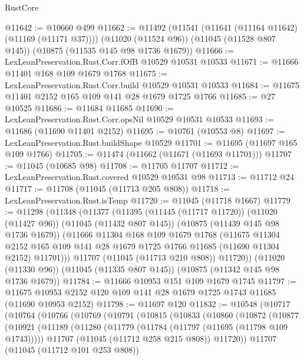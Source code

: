 \begin{lexlean}{RustCore}
\begin{coremodule}
@11642 := @10660 @499
@11662 := @11492
    (@11541 (@11641 (@11164 @11642) (@11169 (@11171 @37))))
    (@11020 (@11524 @96))
    (@11045 (@11528 @807 @145))
    (@10875 (@11535 @145 @98 @1736 @1679))
@11666 := LexLeanPreservation.Rust.Corr.fOfB @10529 @10531 @10533
@11671 := @11666 @11401 @168 @109 @1679 @1768
@11675 := LexLeanPreservation.Rust.Corr.build @10529 @10531 @10533
@11684 := @11675 @11401 @2152 @165 @109 @141 @28 @1679 @1725 @1766
@11685 := @27 @10525
@11686 := @11684 @11685
@11690 := LexLeanPreservation.Rust.Corr.opsNil @10529 @10531 @10533
@11693 := @11686 (@11690 @11401 @2152)
@11695 := @10761 (@10553 @8)
@11697 := LexLeanPreservation.Rust.buildShape @10529
@11701 := @11695 (@11697 @165 @109 @1766)
@11705 := @11474 (@11662 (@11671 (@11693 @11701)))
@11707 := @11045 (@10685 @98)
@11708 := @11705 @11707
@11712 := LexLeanPreservation.Rust.covered @10529 @10531 @98
@11713 := @11712 @24
@11717 := @11708 (@11045 (@11713 @205 @808))
@11718 := LexLeanPreservation.Rust.isTemp
@11720 := @11045 (@11718 @1667)
@11779 := @11298
    (@11348
      (@11377
        (@11395
          (@11445 (@11717 @11720))
          (@11020 (@11427 @96))
          (@11045 (@11432 @807 @145))
          (@10875 (@11439 @145 @98 @1736 @1679))
          (@11666
            @11304
            @168
            @109
            @1679
            @1768
            (@11675
              @11304
              @2152
              @165
              @109
              @141
              @28
              @1679
              @1725
              @1766
              @11685
              (@11690 @11304 @2152)
              @11701)))
        @11707
        (@11045 (@11713 @210 @808))
        @11720))
    (@11020 (@11330 @96))
    (@11045 (@11335 @807 @145))
    (@10875 (@11342 @145 @98 @1736 @1679))
@11784 := @11666 @10953 @151 @109 @1679 @1745
@11797 := @11675 @10953 @2152 @120 @109 @141 @28 @1679 @1725 @1743 @11685 (@11690 @10953 @2152)
@11798 := @11697 @120
@11832 := @10548
    (@10717
      (@10764
        (@10766
          (@10769
            (@10791
              (@10815
                (@10833
                  (@10860
                    (@10872
                      (@10877
                        (@10921
                          (@11189
                            (@11280
                              (@11779 (@11784 (@11797 (@11695 (@11798 @109 @1743)))))
                              @11707
                              (@11045 (@11712 @258 @215 @808))
                              @11720))
                          @11707
                          (@11045 (@11712 @101 @253 @808))

\end{coremodule}
\end{lexlean}
